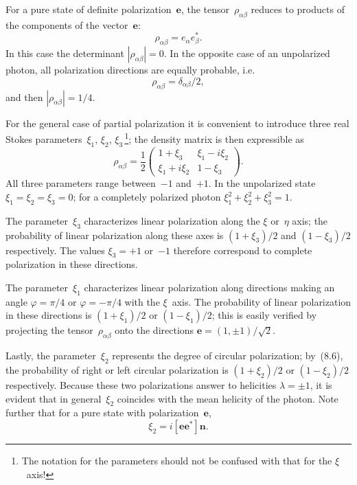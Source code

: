 For a pure state of definite polarization~$\mathbf{e}$, the tensor~$\rho_{\alpha\beta}$ reduces to products of the components of the vector~$\mathbf{e}$:
\begin{equation}
\rho_{\alpha\beta} = e_\alpha e_\beta^*.
\tag{8.7}
\end{equation}
In this case the determinant $|\rho_{\alpha\beta}| = 0$. In the opposite case of an unpolarized photon, all polarization directions are equally probable, i.e.\
\begin{equation}
\rho_{\alpha\beta} = \delta_{\alpha\beta}/2,
\tag{8.8}
\end{equation}
and then $|\rho_{\alpha\beta}| = 1/4$.

For the general case of partial polarization it is convenient to introduce three real Stokes parameters~$\xi_1$, $\xi_2$, $\xi_3$\,\footnote{The notation for the parameters should not be confused with that for the $\xi$~axis!}; the density matrix is then expressible as
\begin{equation}
\rho_{\alpha\beta} = \frac{1}{2}\begin{pmatrix}1 + \xi_3 & \xi_1 - i\xi_2 \\ \xi_1 + i\xi_2 & 1 - \xi_3\end{pmatrix}.
\tag{8.9}
\end{equation}
All three parameters range between~$-1$ and~$+1$. In the unpolarized state $\xi_1 = \xi_2 = \xi_3 = 0$; for a completely polarized photon $\xi_1^2 + \xi_2^2 + \xi_3^2 = 1$.

The parameter~$\xi_3$ characterizes linear polarization along the $\xi$ or~$\eta$ axis; the probability of linear polarization along these axes is $(1 + \xi_3)/2$ and $(1 - \xi_3)/2$ respectively. The values $\xi_3 = +1$ or~$-1$ therefore correspond to complete polarization in these directions.

The parameter~$\xi_1$ characterizes linear polarization along directions making an angle $\varphi = \pi/4$ or $\varphi = -\pi/4$ with the $\xi$~axis. The probability of linear polarization in these directions is $(1 + \xi_1)/2$ or $(1 - \xi_1)/2$; this is easily verified by projecting the tensor~$\rho_{\alpha\beta}$ onto the directions $\mathbf{e} = (1, \pm 1)/\sqrt{2}$.

Lastly, the parameter~$\xi_2$ represents the degree of circular polarization; by~(8.6), the probability of right or left circular polarization is $(1 + \xi_2)/2$ or $(1 - \xi_2)/2$ respectively. Because these two polarizations answer to helicities $\lambda = \pm 1$, it is evident that in general~$\xi_2$ coincides with the mean helicity of the photon. Note further that for a pure state with polarization~$\mathbf{e}$,
\begin{equation}
\xi_2 = i[\mathbf{ee}^*]\mathbf{n}.
\tag{8.10}
\end{equation}

